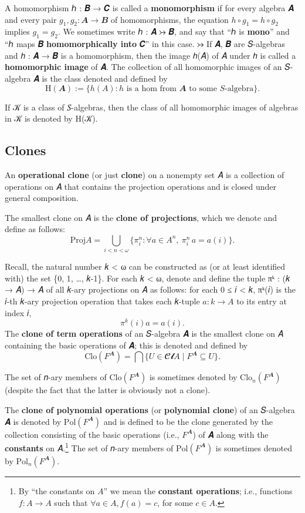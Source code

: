 \documentclass[sigplan,screen]{acmart}
\begin{document}
A homomorphism ℎ : 𝑩 → 𝑪 is called a \textbf{monomorphism} if for every algebra 𝑨 and every pair \(g_1, g_2: 𝑨 → 𝑩\) of homomorphisms, the equation \(h ∘ g_1 = h ∘ g_2\) implies \(g_1 = g_2\). We sometimes write ℎ : 𝑨 ↣ 𝑩, and say that ``ℎ is \textbf{mono}'' and ``ℎ maps 𝑩 \textbf{homomorphically into} 𝑪'' in this case.
↣
If 𝑨, 𝑩 are 𝑆-algebras and ℎ : 𝑨 → 𝑩 is a homomorphism, then the image ℎ(𝐴) of 𝐴 under ℎ is called a \textbf{homomorphic image} of 𝑨. The collection of all homomorphic images of an 𝑆-algebra 𝑨 is the class denoted and defined by
\[\mathrm H(𝑨) := \{h(𝐴) : h \text{ is a hom from 𝑨 to some 𝑆-algebra}\}.\]

If 𝒦 is a class of 𝑆-algebras, then the class of all homomorphic images of algebras in 𝒦 is denoted by H(𝒦).

\subsection{Clones}\label{clones}
An \textbf{operational clone} (or just \textbf{clone}) on a nonempty set 𝐴 is a collection of operations on 𝐴 that contains the projection operations and is closed under general composition.

The smallest clone on 𝐴 is the \textbf{clone of projections}, which we denote and define as follows:
\[\mathrm{Proj}  A = ⋃_{i < n < ω}  \{π^n_i : ∀ a ∈ A^n,\ π^n_i\, a = a(i)\}.\]

Recall, the natural number 𝑘 \textless{} ω can be constructed as (or at least identified with) the set \{0, 1, …, 𝑘-1\}. For each 𝑘 \textless{} ω, denote and define the tuple πᵏ : (𝑘 → 𝐴) → 𝐴 of all 𝑘-ary projections on 𝐴 as follows: for each 0 ≤ 𝑖 \textless{} 𝑘, πᵏ(𝑖) is the 𝑖-th 𝑘-ary projection operation that takes each 𝑘-tuple \(𝑎 : 𝑘 → 𝐴\) to its
entry at index 𝑖, \[π^k (i) a = a(i).\]
The \textbf{clone of term operations} of an 𝑆-algebra 𝑨 is the smallest clone on 𝐴 containing the basic operations of 𝑨; this is denoted and defined by \[\mathrm{Clo}(F^𝑨) = ⋂ \{ U ∈ 𝓒𝓵 A ∣ F^𝑨 ⊆ U\}.\]

The set of 𝑛-ary members of \(\mathrm{Clo}(F^𝑨)\) is sometimes denoted by \(\mathrm{Clo}_n (F^𝑨)\) (despite the fact that the latter is obviously not a clone).

The \textbf{clone of polynomial operations} (or \textbf{polynomial clone}) of an 𝑆-algebra 𝑨 is denoted by \(\mathrm{Pol} (F^𝑨)\) and is defined to be the clone generated by the collection consisting of the basic operations (i.e., \(F^𝑨\)) of 𝑨 along with the \textbf{constants} on 𝐴.\footnote{By ``the constants on \(A\)'' we mean the \textbf{constant operations}; i.e., functions \(f: A → A\) such that \(∀ a ∈ A, f(a) = c\), for some \(c ∈ A\).} The set of 𝑛-ary members of \(\mathrm{Pol} (F^𝑨)\) is sometimes denoted by \(\mathrm{Pol}_n (F^𝑨)\).
\end{document}
